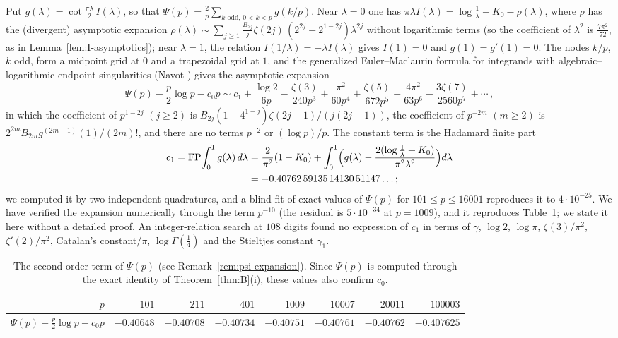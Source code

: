 \begin{remark}\label{rem:psi-expansion}
Put $g(\lambda)=\cot\frac{\pi\lambda}{2}\,I(\lambda)$, so that $\Psi(p)=\frac2p\sum_{k\text{ odd},\,0<k<p}g(k/p)$. Near
$\lambda=0$ one has $\pi\lambda I(\lambda)=\log\frac1\lambda+K_0-\rho(\lambda)$, where $\rho$ has the (divergent)
asymptotic expansion $\rho(\lambda)\sim\sum_{j\ge1}\frac{B_{2j}}{j}\zeta(2j)\,(2^{2j}-2^{1-2j})\lambda^{2j}$ without
logarithmic terms (so the coefficient of $\lambda^2$ is $\frac{7\pi^2}{72}$, as in Lemma~\ref{lem:I-asymptotics}); near $\lambda=1$, the
relation $I(1/\lambda)=-\lambda I(\lambda)$ gives $I(1)=0$ and $g(1)=g'(1)=0$. The nodes $k/p$, $k$ odd, form a
midpoint grid at $0$ and a trapezoidal grid at $1$, and the generalized Euler--Maclaurin formula for integrands with
algebraic--logarithmic endpoint singularities (Navot \cite{b21,b22}) gives the asymptotic expansion
\[
\Psi(p)-\frac p2\log p-c_0p\sim c_1+\frac{\log2}{6p}-\frac{\zeta(3)}{240p^3}+\frac{\pi^2}{60p^4}+\frac{\zeta(5)}{672p^5}
-\frac{4\pi^2}{63p^6}-\frac{3\zeta(7)}{2560p^7}+\cdots\,,
\]
in which the coefficient of $p^{1-2j}$ $(j\ge2)$ is $B_{2j}(1-4^{1-j})\zeta(2j-1)/(j(2j-1))$, the coefficient of
$p^{-2m}$ $(m\ge2)$ is $2^{2m}B_{2m}g^{(2m-1)}(1)/(2m)!$, and there are no terms $p^{-2}$ or $(\log p)/p$. The
constant term is the Hadamard finite part
\begin{align*}
c_1=\mathrm{FP}\!\int_0^1g(\lambda)\,d\lambda
&=\frac{2}{\pi^2}(1-K_0)+\int_0^1\Bigl(g(\lambda)-\frac{2(\log\frac1\lambda+K_0)}{\pi^2\lambda^2}\Bigr)d\lambda\\
&=-0.40762\,59135\,14130\,51147\ldots;
\end{align*}
we computed it by two independent quadratures, and a blind fit of exact values of $\Psi(p)$ for
$101\le p\le16001$ reproduces it to $4\cdot10^{-25}$. We have verified the expansion numerically through the term
$p^{-10}$ (the residual is $5\cdot10^{-34}$ at $p=1009$), and it reproduces Table~\ref{tab:Psi-second-order}; we
state it here without a detailed proof. An integer-relation search at $108$ digits found no expression of $c_1$ in
terms of $\gamma$, $\log2$, $\log\pi$, $\zeta(3)/\pi^2$, $\zeta'(2)/\pi^2$, Catalan's constant$/\pi$,
$\log\Gamma(\frac14)$ and the Stieltjes constant $\gamma_1$.
\end{remark}

\begin{table}[ht]
\centering
{\small
\begin{tabular}{rrrrrrrr}
\toprule
$p$ & $101$ & $211$ & $401$ & $1009$ & $10007$ & $20011$ & $100003$\\
\midrule
$\Psi(p)-\frac p2\log p-c_0p$ & $-0.40648$ & $-0.40708$ & $-0.40734$ & $-0.40751$ & $-0.40761$ & $-0.40762$ & $-0.407625$\\
\bottomrule
\end{tabular}}
\caption{The second-order term of $\Psi(p)$ (see Remark~\ref{rem:psi-expansion}). Since $\Psi(p)$ is computed
through the exact identity of Theorem~\ref{thm:B}(i), these values also confirm $c_0$.}
\label{tab:Psi-second-order}
\end{table}

